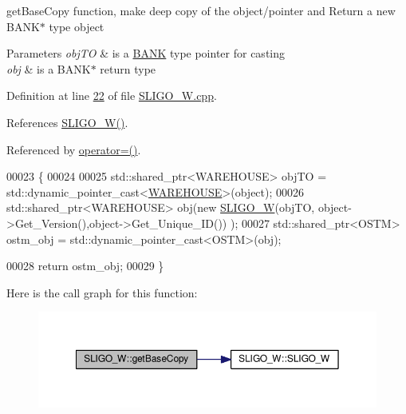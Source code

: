 get\+Base\+Copy function, make deep copy of the object/pointer and Return a new B\+A\+N\+K$\ast$ type object 


\begin{DoxyParams}{Parameters}
{\em obj\+TO} & is a \hyperlink{class_b_a_n_k}{B\+A\+NK} type pointer for casting \\
\hline
{\em obj} & is a B\+A\+N\+K$\ast$ return type \\
\hline
\end{DoxyParams}


Definition at line \hyperlink{_s_l_i_g_o___w_8cpp_source_l00022}{22} of file \hyperlink{_s_l_i_g_o___w_8cpp_source}{S\+L\+I\+G\+O\+\_\+\+W.\+cpp}.



References \hyperlink{_s_l_i_g_o___w_8h_source_l00024}{S\+L\+I\+G\+O\+\_\+\+W()}.



Referenced by \hyperlink{_s_l_i_g_o___w_8h_source_l00075}{operator=()}.


\begin{DoxyCode}
00023 \{
00024 
00025     std::shared\_ptr<WAREHOUSE> objTO = std::dynamic\_pointer\_cast<\hyperlink{class_w_a_r_e_h_o_u_s_e}{WAREHOUSE}>(object);
00026     std::shared\_ptr<WAREHOUSE> obj(\textcolor{keyword}{new} \hyperlink{class_s_l_i_g_o___w_a9b669809dc7cf8d9982181ac7997b0da}{SLIGO\_W}(objTO, object->Get\_Version(),\textcolor{keywordtype}{object}->Get\_Unique\_ID())
      );
00027     std::shared\_ptr<OSTM> ostm\_obj = std::dynamic\_pointer\_cast<OSTM>(obj);                                 
       
00028     \textcolor{keywordflow}{return} ostm\_obj;
00029 \}
\end{DoxyCode}


Here is the call graph for this function\+:\nopagebreak
\begin{figure}[H]
\begin{center}
\leavevmode
\includegraphics[width=350pt]{class_s_l_i_g_o___w_a37ead49afd27bfe7e404d1d7626f09fe_cgraph}
\end{center}
\end{figure}




